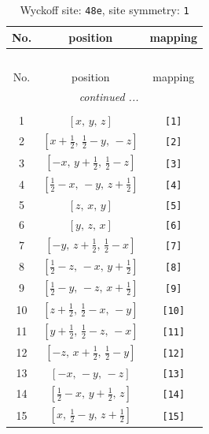 \documentclass[fleqn,8pt]{jsarticle}
\begin{document}
\renewcommand{\arraystretch}{1.2}
\begin{longtable}{ccc}
\caption{Wyckoff site: {\tt 48e}, site symmetry: {\tt 1}}
 \\
 \hline \hline
No. & position & mapping \\ \hline \endfirsthead

\multicolumn{2}{l}{\tablename\ \thetable{}} \\
 \hline \hline
No. & position & mapping \\ \hline \endhead

 \hline \hline
\multicolumn{2}{r}{\footnotesize\it continued ...} \\ \endfoot

 \hline \hline
\multicolumn{2}{r}{} \\ \endlastfoot

1 & $\left[ x,\, y,\, z \right]$ & {\tt [1]} \\ \hline
2 & $\left[ x + \frac{1}{2},\, \frac{1}{2} - y,\, - z \right]$ & {\tt [2]} \\ \hline
3 & $\left[ - x,\, y + \frac{1}{2},\, \frac{1}{2} - z \right]$ & {\tt [3]} \\ \hline
4 & $\left[ \frac{1}{2} - x,\, - y,\, z + \frac{1}{2} \right]$ & {\tt [4]} \\ \hline
5 & $\left[ z,\, x,\, y \right]$ & {\tt [5]} \\ \hline
6 & $\left[ y,\, z,\, x \right]$ & {\tt [6]} \\ \hline
7 & $\left[ - y,\, z + \frac{1}{2},\, \frac{1}{2} - x \right]$ & {\tt [7]} \\ \hline
8 & $\left[ \frac{1}{2} - z,\, - x,\, y + \frac{1}{2} \right]$ & {\tt [8]} \\ \hline
9 & $\left[ \frac{1}{2} - y,\, - z,\, x + \frac{1}{2} \right]$ & {\tt [9]} \\ \hline
10 & $\left[ z + \frac{1}{2},\, \frac{1}{2} - x,\, - y \right]$ & {\tt [10]} \\ \hline
11 & $\left[ y + \frac{1}{2},\, \frac{1}{2} - z,\, - x \right]$ & {\tt [11]} \\ \hline
12 & $\left[ - z,\, x + \frac{1}{2},\, \frac{1}{2} - y \right]$ & {\tt [12]} \\ \hline
13 & $\left[ - x,\, - y,\, - z \right]$ & {\tt [13]} \\ \hline
14 & $\left[ \frac{1}{2} - x,\, y + \frac{1}{2},\, z \right]$ & {\tt [14]} \\ \hline
15 & $\left[ x,\, \frac{1}{2} - y,\, z + \frac{1}{2} \right]$ & {\tt [15]} \\ \hline

\end{longtable}
\end{document}
